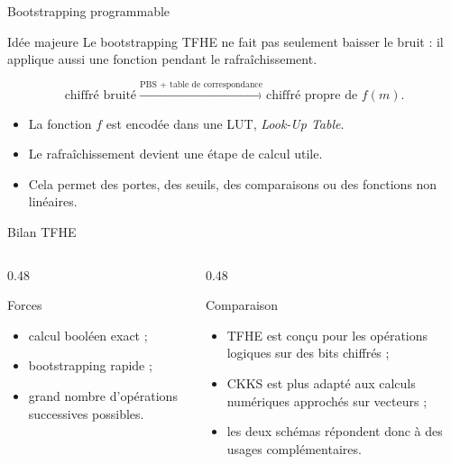 \documentclass[10pt,aspectratio=169]{beamer}
\begin{document}
\begin{frame}{Bootstrapping programmable}
  \begin{block}{Idée majeure}
    Le bootstrapping TFHE ne fait pas seulement baisser le bruit : il applique aussi une fonction pendant le rafraîchissement.
  \end{block}

  \begin{center}
    \[
      \text{chiffré bruité}
      \xrightarrow{\text{PBS + table de correspondance}}
      \text{chiffré propre de } f(m).
    \]
  \end{center}

  \begin{itemize}
    \item La fonction $f$ est encodée dans une LUT, \textit{Look-Up Table}.
    \item Le rafraîchissement devient une étape de calcul utile.
    \item Cela permet des portes, des seuils, des comparaisons ou des fonctions non linéaires.
  \end{itemize}
\end{frame}

\begin{frame}{Bilan TFHE}

  \begin{columns}[T,onlytextwidth]

    \begin{column}{0.48\textwidth}
      \begin{exampleblock}{Forces}
        \begin{itemize}
          \item calcul booléen exact ;
          \item bootstrapping rapide ;
          \item grand nombre d’opérations successives possibles.
        \end{itemize}
      \end{exampleblock}
    \end{column}

    \begin{column}{0.48\textwidth}
      \begin{alertblock}{Comparaison}
        \begin{itemize}
          \item TFHE est conçu pour les opérations logiques sur des bits chiffrés ;
          \item CKKS est plus adapté aux calculs numériques approchés sur vecteurs ;
          \item les deux schémas répondent donc à des usages complémentaires.
        \end{itemize}
      \end{alertblock}
    \end{column}

  \end{columns}

\end{frame}
\end{document}
